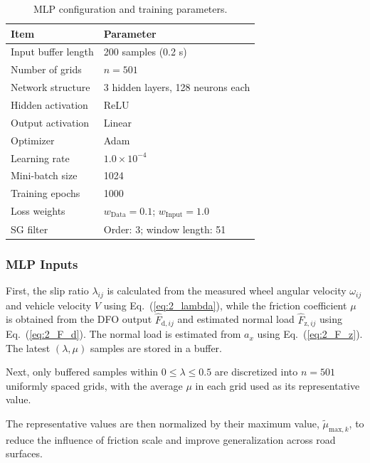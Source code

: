 \documentclass[dvipdfmx,conference]{IEEEtran}
\begin{document}
\begin{table}[t]
    \centering
    \caption{MLP configuration and training parameters.}
    \label{tab:mlp_parameters}
    \footnotesize
    \setlength{\tabcolsep}{3pt}
    \begin{tabular}{p{}p{}}
        \hline
        Item & Parameter \\
        \hline
        Input buffer length & 200 samples (0.2 s)\\
        Number of grids & $n=501$ \\
        Network structure & 3 hidden layers, 128 neurons each \\
        Hidden activation & ReLU \\
        Output activation & Linear \\
        Optimizer & Adam \\
        Learning rate & $1.0\times10^{-4}$ \\
        Mini-batch size & 1024 \\
        Training epochs & 1000 \\
        Loss weights & $w_{\mathrm{Data}}=0.1$; $w_{\mathrm{Input}}=1.0$ \\
        SG filter & Order: 3; window length: 51 \\
        \hline
    \end{tabular}
\end{table}

\subsubsection{MLP Inputs}
First, the slip ratio $\lambda_{ij}$ is calculated from the measured wheel angular velocity $\omega_{ij}$ and vehicle velocity $V$ using Eq.~(\ref{eq:2_lambda}), while the friction coefficient $\mu$ is obtained from the DFO output $\hat{F}_{\mathrm{d},ij}$ and estimated normal load $\hat{F}_{\mathrm{z},ij}$ using Eq.~(\ref{eq:2_F_d}). The normal load is estimated from $a_x$ using Eq.~(\ref{eq:2_F_z}). The latest $(\lambda,\mu)$ samples are stored in a buffer.

Next, only buffered samples within $0\leq\lambda\leq0.5$ are discretized into $n=501$ uniformly spaced grids, with the average $\mu$ in each grid used as its representative value.

The representative values are then normalized by their maximum value, $\tilde{\mu}_{\mathrm{max},k}$, to reduce the influence of friction scale and improve generalization across road surfaces.
\end{document}
